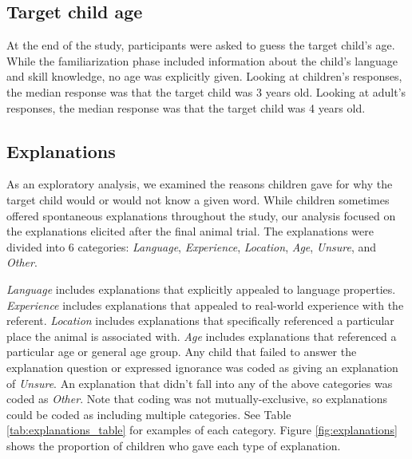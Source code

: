 \documentclass[10pt, letterpaper]{article}
\begin{document}
\hypertarget{target-child-age}{%
\subsection{Target child age}\label{target-child-age}}

At the end of the study, participants were asked to guess the target
child's age. While the familiarization phase included information about
the child's language and skill knowledge, no age was explicitly given.
Looking at children's responses, the median response was that the target
child was 3 years old. Looking at adult's responses, the median response
was that the target child was 4 years old.

\hypertarget{explanations}{%
\subsection{Explanations}\label{explanations}}

As an exploratory analysis, we examined the reasons children gave for
why the target child would or would not know a given word. While
children sometimes offered spontaneous explanations throughout the
study, our analysis focused on the explanations elicited after the final
animal trial. The explanations were divided into 6 categories:
\emph{Language}, \emph{Experience}, \emph{Location}, \emph{Age},
\emph{Unsure}, and \emph{Other}.

\emph{Language} includes explanations that explicitly appealed to
language properties. \emph{Experience} includes explanations that
appealed to real-world experience with the referent. \emph{Location}
includes explanations that specifically referenced a particular place
the animal is associated with. \emph{Age} includes explanations that
referenced a particular age or general age group. Any child that failed
to answer the explanation question or expressed ignorance was coded as
giving an explanation of \emph{Unsure}. An explanation that didn't fall
into any of the above categories was coded as \emph{Other}. Note that
coding was not mutually-exclusive, so explanations could be coded as
including multiple categories. See Table \ref{tab:explanations_table}
for examples of each category. Figure \ref{fig:explanations} shows the
proportion of children who gave each type of explanation.
\end{document}
